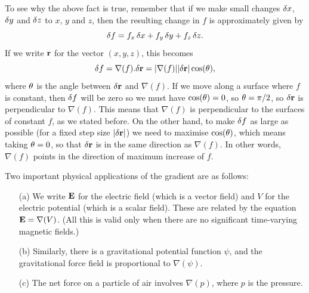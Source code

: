 \documentclass[reqno]{amsart}
\theoremstyle{definition}
\begin{document}
To see why the above fact is true, remember that if we make small
changes $\delta x$, $\delta y$ and $\delta z$ to $x$, $y$ and $z$, then the
resulting change in $f$ is approximately given by 
\[ \delta f = f_x\,\delta x + f_y\,\delta y + f_z\,\delta z. \]
If we write $\mathbf{r}$ for the vector $(x,y,z)$, this becomes
\[ \delta f = \nabla(f).\delta\mathbf{r} = |\nabla(f)||\delta\mathbf{r}|\cos(\theta), \] 
where $\theta$ is the angle between $\delta\mathbf{r}$ and $\nabla(f)$.  If we
move along a surface where $f$ is constant, then $\delta f$ will be zero
so we must have $\cos(\theta)=0$, so $\theta=\pi/2$, so $\delta\mathbf{r}$ is
perpendicular to $\nabla(f)$.  This means that $\nabla(f)$ is
perpendicular to the surfaces of constant $f$, as we stated before.
On the other hand, to make $\delta f$ as large as possible (for a fixed
step size $|\delta\mathbf{r}|$) we need to maximise $\cos(\theta)$, which means
taking $\theta=0$, so that $\delta\mathbf{r}$ is in the same direction as
$\nabla(f)$.  In other words, $\nabla(f)$ points in the direction of
maximum increase of $f$.

Two important physical applications of the gradient are as follows:
\begin{itemize}
 \item[(a)] We write $\mathbf{E}$ for the electric field (which is a vector
  field) and $V$ for the electric potential (which is a scalar
  field).  These are related by the equation $\mathbf{E}=\nabla(V)$.
  (All this is valid only when there are no significant time-varying
  magnetic fields.)
 \item[(b)] Similarly, there is a gravitational potential function
  $\psi$, and the gravitational force field is proportional to
  $\nabla(\psi)$. 
 \item[(c)] The net force on a particle of air involves $\nabla(p)$,
  where $p$ is the pressure.
\end{itemize}
\end{document}
